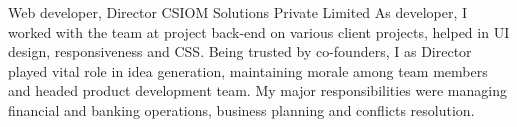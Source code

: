     {Web developer, Director}
    {}
    {CSIOM Solutions Private Limited}
    {}
    {As developer, I worked with the team at project back-end on various client projects, helped in UI design, responsiveness and CSS. Being trusted by co-founders, I as Director played vital role in idea generation, maintaining morale among team members and headed product development team. My major responsibilities were managing financial and banking operations, business planning and conflicts resolution.
    }
    \vspace*{0.2\baselineskip}
